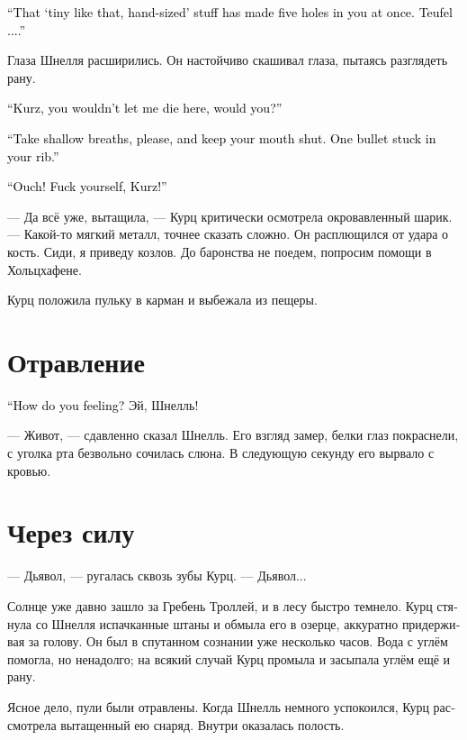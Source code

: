 \documentclass[a4paper,12pt,fleqn]{book}\usepackage{cooltooltips}\usepackage{polyglossia}\setdefaultlanguage[babelshorthands=true]{russian}\setotherlanguage{english}\defaultfontfeatures{Ligatures=TeX,Mapping=tex-text} \usepackage{xcolor}\definecolor{lightgray}{HTML}{bbbbbb}\color{lightgray}\newcommand{\ml}[3]{\textenglish{\textcolor{black}{#3}}}
\begin{document}
\ml{$0$}
{--- Этот <<маленький, размером с ладошку>> понаделал в тебе пять дырок одним залпом.}
{``That `tiny like that, hand-sized' stuff has made five holes in you at once.}
\ml{$0$}
{Дьявол...}
{Teufel ....''}

Глаза Шнелля расширились.
Он настойчиво скашивал глаза, пытаясь разглядеть рану.

\ml{$0$}
{--- Курц, ты же не дашь мне сдохнуть здесь, правда?}
{``Kurz, you wouldn't let me die here, would you?''}

\ml{$0$}
{--- Дыши мелкими глотками, пожалуйста, и заткнись.}
{``Take shallow breaths, please, and keep your mouth shut.}
\ml{$0$}
{Одна пулька застряла в ребре.}
{One bullet stuck in your rib.''}

\ml{$0$}
{--- Ай!}
{``Ouch!}
\ml{$0$}
{Чёрт бы тебя побрал, Курц!}
{Fuck yourself, Kurz!''}

--- Да всё уже, вытащила, --- Курц критически осмотрела окровавленный шарик.
--- Какой-то мягкий металл, точнее сказать сложно.
Он расплющился от удара о кость.
Сиди, я приведу козлов.
До баронства не поедем, попросим помощи в Хольцхафене.

Курц положила пульку в карман и выбежала из пещеры.

\section{Отравление}

\ml{$0$}
{--- Как ты себя чувствуешь?}
{``How do you feeling?}
Эй, Шнелль!

--- Живот, --- сдавленно сказал Шнелль.
Его взгляд замер, белки глаз покраснели, с уголка рта безвольно сочилась слюна.
В следующую секунду его вырвало с кровью.

\section{Через силу}

--- Дьявол, --- ругалась сквозь зубы Курц.
--- Дьявол...

Солнце уже давно зашло за Гребень Троллей, и в лесу быстро темнело.
Курц стянула со Шнелля испачканные штаны и обмыла его в озерце, аккуратно придерживая за голову.
Он был в спутанном сознании уже несколько часов.
Вода с углём помогла, но ненадолго;
на всякий случай Курц промыла и засыпала углём ещё и рану.

Ясное дело, пули были отравлены.
Когда Шнелль немного успокоился, Курц рассмотрела вытащенный ею снаряд.
Внутри оказалась полость.
\end{document}
